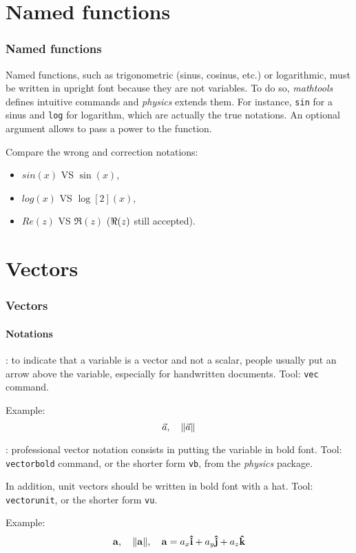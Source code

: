 \documentclass[11pt]{beamer}
\begin{document}
\section{Named functions}

\begin{frame}
	\frametitle{Named functions}
	
	Named functions, such as trigonometric (sinus, cosinus, etc.) or logarithmic, must be written in upright font because they are not variables.
	To do so, \emph{mathtools} defines intuitive commands and \emph{physics} extends them.
	For instance, \texttt{sin} for a sinus and \texttt{log} for logarithm, which are actually the true notations.
	An optional argument allows to pass a power to the function.
	
	Compare the wrong and correction notations:
	\begin{itemize}
		\item $sin(x)$ VS $\sin(x)$,
		\item $log(x)$ VS $\log[2](x)$,
		\item $Re(z)$ VS $\Re(z)$ ($\real(z)$ still accepted).
	\end{itemize}
\end{frame}


\section{Vectors}

\begin{frame}
	\frametitle{Vectors}
	\framesubtitle{Notations}
	
	: to indicate that a variable is a vector and not a scalar, people usually put an arrow above the variable, especially for handwritten documents.
	Tool: \texttt{vec} command.
	
	Example:
	\begin{equation*}
		\vec{a}, \quad
		\norm{\vec{a}}
	\end{equation*}
	

	: professional vector notation consists in putting the variable in bold font.
	Tool: \texttt{vectorbold} command, or the shorter form \texttt{vb}, from the \emph{physics} package.
	
	In addition, unit vectors should be written in bold font with a hat.
	Tool: \texttt{vectorunit}, or the shorter form \texttt{vu}.
	
	Example:
	\begin{equation*}
		\vb{a}, \quad
		\norm{\vb{a}}, \quad
		\vb{a} = a_x \vu{i} + a_y\vu{j} + a_z\vu{k}
	\end{equation*}
\end{frame}
\end{document}
